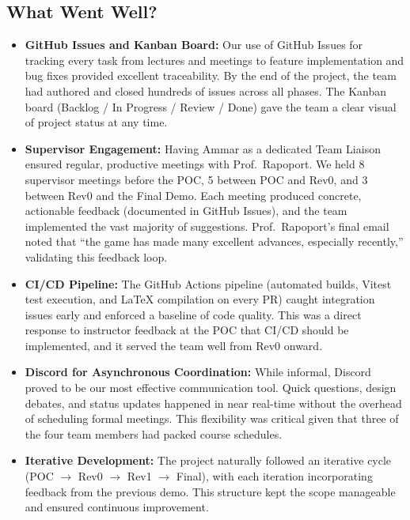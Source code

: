 \documentclass{article}
\begin{document}
\subsection{What Went Well?}

\begin{itemize}
  \item \textbf{GitHub Issues and Kanban Board:} Our use of GitHub Issues for tracking every task from lectures and meetings to feature implementation and bug fixes provided excellent traceability. By the end of the project, the team had authored and closed hundreds of issues across all phases. The Kanban board (Backlog / In Progress / Review / Done) gave the team a clear visual of project status at any time.

  \item \textbf{Supervisor Engagement:} Having Ammar as a dedicated Team Liaison ensured regular, productive meetings with Prof.\ Rapoport. We held 8 supervisor meetings before the POC, 5 between POC and Rev0, and 3 between Rev0 and the Final Demo. Each meeting produced concrete, actionable feedback (documented in GitHub Issues), and the team implemented the vast majority of suggestions. Prof.\ Rapoport's final email noted that ``the game has made many excellent advances, especially recently,'' validating this feedback loop.

  \item \textbf{CI/CD Pipeline:} The GitHub Actions pipeline (automated builds, Vitest test execution, and LaTeX compilation on every PR) caught integration issues early and enforced a baseline of code quality. This was a direct response to instructor feedback at the POC that CI/CD should be implemented, and it served the team well from Rev0 onward.

  \item \textbf{Discord for Asynchronous Coordination:} While informal, Discord proved to be our most effective communication tool. Quick questions, design debates, and status updates happened in near real-time without the overhead of scheduling formal meetings. This flexibility was critical given that three of the four team members had packed course schedules.

  \item \textbf{Iterative Development:} The project naturally followed an iterative cycle (POC $\rightarrow$ Rev0 $\rightarrow$ Rev1 $\rightarrow$ Final), with each iteration incorporating feedback from the previous demo. This structure kept the scope manageable and ensured continuous improvement.
\end{itemize}
\end{document}
